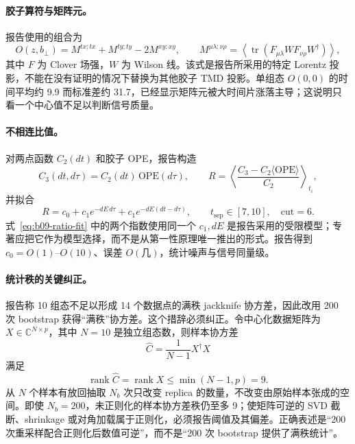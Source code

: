 \paragraph{胶子算符与矩阵元。}
报告使用的组合为
\begin{equation}
  O(z,b_\perp)=M^{tx;tx}+M^{ty;ty}-2M^{xy;xy},
  \qquad
  M^{\mu\lambda;\nu\rho}=\left\langle
  \operatorname{tr}\left(F_{\mu\lambda}WF_{\nu\rho}W^\dagger\right)
  \right\rangle,
  \label{eq:b09-tmd-operator}
\end{equation}
其中 \(F\) 为 Clover 场强，\(W\) 为 Wilson 线。该式是报告所采用的特定 Lorentz 投影，不能在没有证明的情况下替换为其他胶子 TMD 投影。单组态 \(O(0,0)\) 的时间平均约 9.9 而标准差约 31.7，已经显示矩阵元被大时间片涨落主导；这说明只看一个中心值不足以判断信号质量。

\paragraph{不相连比值。}
对两点函数 \(C_2(dt)\) 和胶子 OPE，报告构造
\begin{equation}
  C_3(dt,d\tau)=C_2(dt)\,\mathrm{OPE}(d\tau),
  \qquad
  R=\left\langle
  \frac{C_3-C_2\langle\mathrm{OPE}\rangle}{C_2}
  \right\rangle_{t_i},
  \label{eq:b09-ratio}
\end{equation}
并拟合
\begin{equation}
  R=c_0+c_1e^{-dE\,d\tau}+c_1e^{-dE(dt-d\tau)},
  \qquad t_{\mathrm{sep}}\in[7,10],\quad \mathrm{cut}=6.
  \label{eq:b09-ratio-fit}
\end{equation}
式~\eqref{eq:b09-ratio-fit} 中的两个指数使用同一个 \(c_1,dE\) 是报告采用的受限模型；专著应把它作为模型选择，而不是从第一性原理唯一推出的形式。报告得到 \(c_0=O(1)\)--\(O(10)\)、误差 \(O(\text{几})\)，统计噪声与信号同量级。

\paragraph{统计秩的关键纠正。}
报告称 10 组态不足以形成 14 个数据点的满秩 jackknife 协方差，因此改用 200 次 bootstrap 获得“满秩”协方差。这个措辞必须纠正。令中心化数据矩阵为 \(X\in\mathbb C^{N\times p}\)，其中 \(N=10\) 是独立组态数，则样本协方差
\begin{equation}
  \widehat C=\frac{1}{N-1}X^\dagger X
  \label{eq:b09-sample-cov}
\end{equation}
满足
\begin{equation}
  \operatorname{rank}\widehat C=\operatorname{rank}X\le \min(N-1,p)=9.
  \label{eq:b09-rank-bound}
\end{equation}
从 \(N\) 个样本有放回抽取 \(N_b\) 次只改变 replica 的数量，不改变由原始样本张成的空间。即使 \(N_b=200\)，未正则化的样本协方差秩仍至多 9；使矩阵可逆的 SVD 截断、shrinkage 或对角加载属于正则化，必须报告阈值及其偏差。正确表述是“200 次重采样配合正则化后数值可逆”，而不是“200 次 bootstrap 提供了满秩统计”。

